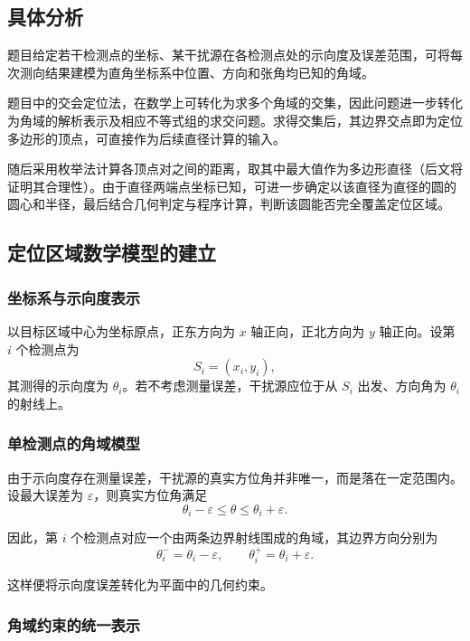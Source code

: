 \documentclass[withoutpreface,bwprint]{cumcmthesis}
\begin{document}
\subsection{具体分析}
题目给定若干检测点的坐标、某干扰源在各检测点处的示向度及误差范围，可将每次测向结果建模为直角坐标系中位置、方向和张角均已知的角域。

题目中的交会定位法，在数学上可转化为求多个角域的交集，因此问题进一步转化为角域的解析表示及相应不等式组的求交问题。求得交集后，其边界交点即为定位多边形的顶点，可直接作为后续直径计算的输入。

随后采用枚举法计算各顶点对之间的距离，取其中最大值作为多边形直径（后文将证明其合理性）。由于直径两端点坐标已知，可进一步确定以该直径为直径的圆的圆心和半径，最后结合几何判定与程序计算，判断该圆能否完全覆盖定位区域。






\subsection{定位区域数学模型的建立}

\subsubsection{坐标系与示向度表示}

以目标区域中心为坐标原点，正东方向为 $x$ 轴正向，正北方向为 $y$ 轴正向。设第 $i$ 个检测点为
\[
S_i=(x_i,y_i),
\]
其测得的示向度为 $\theta_i$。若不考虑测量误差，干扰源应位于从 $S_i$ 出发、方向角为 $\theta_i$ 的射线上。

\subsubsection{单检测点的角域模型}

由于示向度存在测量误差，干扰源的真实方位角并非唯一，而是落在一定范围内。设最大误差为 $\varepsilon$，则真实方位角满足
\[
\theta_i-\varepsilon
\leq
\theta
\leq
\theta_i+\varepsilon.
\]

因此，第 $i$ 个检测点对应一个由两条边界射线围成的角域，其边界方向分别为
\[
\theta_i^-=\theta_i-\varepsilon,
\qquad
\theta_i^+=\theta_i+\varepsilon.
\]

这样便将示向度误差转化为平面中的几何约束。

\subsubsection{角域约束的统一表示}
\end{document}
